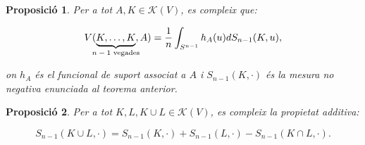 \documentclass{article}
\newtheorem{proposicio}{Proposici\'{o}}
\theoremstyle{definition}
\begin{document}
\begin{proposicio} \label{prop:2}
Per a tot $A, K \in \mathcal{K}(V)$, es compleix que:

\[ V(\underbrace{K, \dots, K}_{\mathclap{\text{$n-1$ vegades}}}, A) = \frac{1}{n} \int_{S^{n-1}} h_A(u) dS_{n-1}(K,u),\]

on $h_A$ \'{e}s el funcional de suport associat a $A$ i $S_{n-1}(K, \cdot)$ \'{e}s la mesura no negativa enunciada al teorema anterior.
\end{proposicio}

\begin{proposicio} \label{prop:s}
Per a tot $K, L, K \cup L \in \mathcal{K}(V)$, es compleix la propietat additiva:

\begin{equation} \label{eq:S}
S_{n-1}(K \cup L, \cdot) = S_{n-1}(K,\cdot) + S_{n-1}(L,\cdot) - S_{n-1}(K \cap L,\cdot).
\end{equation}

\end{proposicio}
\end{document}

